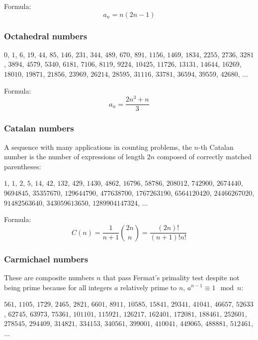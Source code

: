 \documentclass[a4paper,12pt]{article}
\begin{document}
\noindent Formula:
\[a_n=n(2n-1)\]

\subsubsection{Octahedral numbers}

\begin{center}$0$, $1$, $6$, $19$, $44$, $85$, $146$, $231$, $344$, $489$, $670$, $891$, $1156$, $1469$, $1834$, $2255$, $2736$, $3281$, $3894$, $4579$, $5340$, $6181$, $7106$, $8119$, $9224$, $10425$, $11726$, $13131$, $14644$, $16269$, $18010$, $19871$, $21856$, $23969$, $26214$, $28595$, $31116$, $33781$, $36594$, $39559$, $42680$, $\ldots$\end{center}

\noindent Formula:
\[a_n=\frac{2n^3 + n}{3}\]

\subsubsection{Catalan numbers}
A sequence with many applications in counting problems, the $n$-th Catalan number is the number of expressions of length $2n$ composed of correctly matched parentheses:

\begin{center}$1$, $1$, $2$, $5$, $14$, $42$, $132$, $429$, $1430$, $4862$, $16796$, $58786$, $208012$, $742900$, $2674440$, $9694845$, $35357670$, $129644790$, $477638700$, $1767263190$, $6564120420$, $24466267020$, $91482563640$, $343059613650$, $1289904147324$, $\ldots$\end{center}

\noindent Formula:
\[C(n)=\frac{1}{n+1}{2n\choose n} = \frac{(2n)!}{(n+1)!n!}\]

\subsubsection{Carmichael numbers}
These are composite numbers $n$ that pass Fermat's primality test despite not being prime because for all integers $a$ relatively prime to $n$, $a^{n-1}\equiv 1 \mod{n}$:

\begin{center}$561$, $1105$, $1729$, $2465$, $2821$, $6601$, $8911$, $10585$, $15841$, $29341$, $41041$, $46657$, $52633$, $62745$, $63973$, $75361$, $101101$, $115921$, $126217$, $162401$, $172081$, $188461$, $252601$, $278545$, $294409$, $314821$, $334153$, $340561$, $399001$, $410041$, $449065$, $488881$, $512461$, $\ldots$\end{center}
\end{document}
